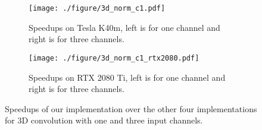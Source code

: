 \begin{figure*}
	
		
	\begin{subfigure}{18cm}
		\centering
		 \texttt{[image: ./figure/3d\_norm\_c1.pdf]}
		 \caption{Speedups on Tesla K40m, left is for one channel and right is for three channels.}
		 \label{fig:3druntimeK40}
	\end{subfigure}
	
	\begin{subfigure}{18cm}
		\centering
		 \texttt{[image: ./figure/3d\_norm\_c1\_rtx2080.pdf]}
		 \caption{Speedups on RTX 2080 Ti, left is for one channel and right is for three channels.}
		 \label{fig:3druntime2080}
	\end{subfigure}
	
	\caption{Speedups of our implementation over the other four implementations for 3D convolution with one and three input channels.}
	\label{fig:3druntime}
\end{figure*}
%	

